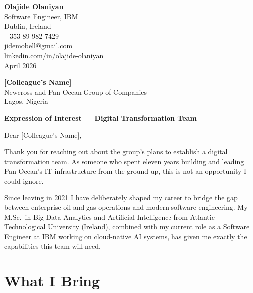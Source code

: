 \documentclass[10pt]{article}
\begin{document}
\begin{flushright}
  {\small
  \textbf{Olajide Olaniyan}\\
  Software Engineer, IBM\\
  Dublin, Ireland\\[2pt]
  +353 89 982 7429\\
  \href{mailto:jidemobell@gmail.com}{jidemobell@gmail.com}\\
  \href{https://linkedin.com/in/olajide-olaniyan}{linkedin.com/in/olajide-olaniyan}\\[4pt]
  {\color{darkgrey}April 2026}
  }
\end{flushright}

\vspace{6pt}

{\small
\textbf{[Colleague's Name]}\\
Newcross and Pan Ocean Group of Companies\\
Lagos, Nigeria
}

\vspace{10pt}

\begin{center}
  {\color{primary}\large\bfseries Expression of Interest ---
  Digital Transformation Team}
\end{center}

\vspace{4pt}


Dear [Colleague's Name],

Thank you for reaching out about the group's plans to establish a digital
transformation team. As someone who spent eleven years building and leading
Pan Ocean's IT infrastructure from the ground up, this is not an opportunity
I could ignore.

Since leaving in 2021 I have deliberately shaped my career to bridge the gap
between enterprise oil and gas operations and modern software engineering.
My M.Sc.\ in Big Data Analytics and Artificial Intelligence from Atlantic
Technological University (Ireland), combined with my current role as a
Software Engineer at IBM working on cloud-native AI systems, has given me
exactly the capabilities this team will need.

\vspace{6pt}

\section{What I Bring}
\end{document}
